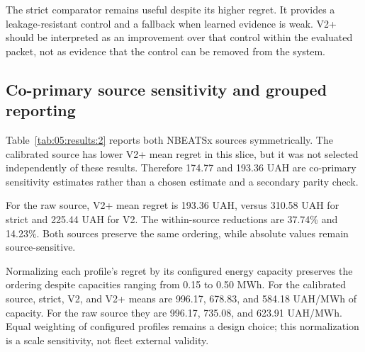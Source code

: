 The strict comparator remains useful despite its higher regret. It provides a leakage-resistant control and a fallback when learned evidence is weak. V2+ should be interpreted as an improvement over that control within the evaluated packet, not as evidence that the control can be removed from the system.

\subsection{Co-primary source sensitivity and grouped reporting}

Table~\ref{tab:05:results:2} reports both NBEATSx sources symmetrically. The calibrated source has lower V2+ mean regret in this slice, but it was not selected independently of these results. Therefore 174.77 and 193.36 UAH are co-primary sensitivity estimates rather than a chosen estimate and a secondary parity check.

\begin{table}[t]
\centering
\caption{Co-primary retrospective sensitivity comparison by NBEATSx source.}
\label{tab:05:results:2}
\small
{}
\end{table}

For the raw source, V2+ mean regret is 193.36 UAH, versus 310.58 UAH for strict and 225.44 UAH for V2. The within-source reductions are 37.74\% and 14.23\%. Both sources preserve the same ordering, while absolute values remain source-sensitive.

Normalizing each profile's regret by its configured energy capacity preserves
the ordering despite capacities ranging from 0.15 to 0.50 MWh. For the
calibrated source, strict, V2, and V2+ means are 996.17, 678.83, and 584.18
UAH/MWh of capacity. For the raw source they are 996.17, 735.08, and 623.91
UAH/MWh. Equal weighting of configured profiles remains a design choice; this
normalization is a scale sensitivity, not fleet external validity.

